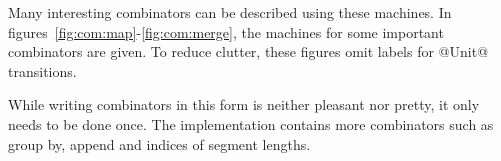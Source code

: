 Many interesting combinators can be described using these machines.
In figures~\ref{fig:com:map}-\ref{fig:com:merge}, the machines for some important combinators are given.
To reduce clutter, these figures omit labels for @Unit@ transitions.

While writing combinators in this form is neither pleasant nor pretty, it only needs to be done once.
The implementation contains more combinators such as group by, append and indices of segment lengths.






